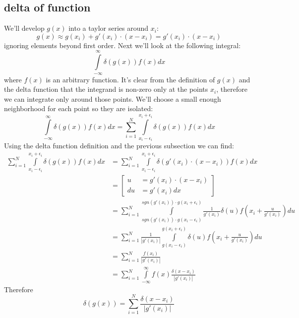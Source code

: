 \subsection{delta of function}
We'll develop \(g(x)\) into a taylor series around \(x_i\):
\begin{equation*}
    g(x) \approx g(x_i)+g'(x_i)\cdot(x-x_i) = g'(x_i)\cdot(x-x_i)
\end{equation*}
ignoring elements beyond first order. Next we'll look at the following integral:
\begin{equation*}
    \int\limits_{-\infty}^\infty\delta(g(x))f(x)dx
\end{equation*}
where \(f(x)\) is an arbitrary function. It's clear from the definition of \(g(x)\) and the delta function that the integrand is non-zero only at the points \(x_i\), therefore we can integrate only around those points. We'll choose a small enough neighborhood for each point so they are isolated:
\begin{equation*}
    \int\limits_{-\infty}^\infty\delta(g(x))f(x)dx =  \sum\limits_{i=1}^N\int\limits_{x_i-\epsilon_i}^{x_i+\epsilon_i}\delta(g(x))f(x)dx
\end{equation*}
Using the delta function definition and the previous subsection we can find:
\begin{align*}
    \sum\limits_{i=1}^N\int\limits_{x_i-\epsilon_i}^{x_i+\epsilon_i}\delta(g(x))f(x)dx &= \sum\limits_{i=1}^N\int\limits_{x_i-\epsilon_i}^{x_i+\epsilon_i}\delta(g'(x_i)\cdot(x-x_i))f(x)dx\\
    &= \left[\begin{aligned}
        u &= g'(x_i)\cdot(x-x_i)\\
        du &= g'(x_i)dx
    \end{aligned}\right]\\ &= \sum\limits_{i=1}^N\int\limits_{sgn(g'(x_i))\cdot g(x_i-\epsilon_i)}^{sgn(g'(x_i))\cdot g(x_i+\epsilon_i)}\frac{1}{g'(x_i)}\delta(u)f\left(x_i+\frac{u}{g'(x_i)}\right)du\\
    &= \sum\limits_{i=1}^N\frac{1}{|g'(x_i)|}\int\limits_{g(x_i-\epsilon_i)}^{g(x_i+\epsilon_i)}\delta(u)f\left(x_i+\frac{u}{g'(x_i)}\right)du\\
    &= \sum\limits_{i=1}^N\frac{f(x_i)}{|g'(x_i)|}\\
    &= \sum\limits_{i=1}^N\int\limits_{-\infty}^\infty f(x)\frac{\delta(x-x_i)}{|g'(x_i)|}
\end{align*}
Therefore
\begin{equation*}
    \delta(g(x)) = \sum\limits_{i=1}^N\frac{\delta(x-x_i)}{|g'(x_i)|}
\end{equation*}
